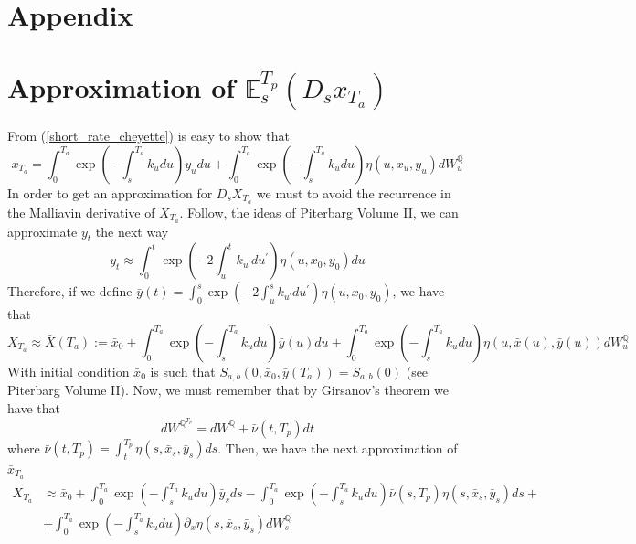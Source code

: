 \documentclass[a4paper,10pt]{article}
\newcommand{\1}{\mathbf{1}}
\begin{document}
\section*{Appendix}
\appendix
\renewcommand{\thesection}{\Alph{section}.\arabic{section}}
\section{Approximation of $\mathbb{E}_s^{T_p}\left(D_s x_{T_a}\right)$}
\label{expected_forward_measure_malliavin_derivative_x_t}
From (\ref{short_rate_cheyette}) is easy to show that
\begin{equation*}
x_{T_a} = \int_{0}^{T_a} \exp\left(-\int_{s}^{T_a}k_u du\right) y_u du + \int_{0}^{T_a}  \exp\left(-\int_{s}^{T_a}k_u du \right) \eta(u,x_u,y_u) dW_u^{\mathbb{Q}}  
\end{equation*}
In order to get an approximation for $D_sX_{T_a}$ we must to avoid the recurrence in the Malliavin derivative of $X_{T_a}$. Follow, the ideas of Piterbarg Volume II, we can approximate $y_t$ the next way
\begin{equation*}
y_t \approx \int_{0}^{t} \exp\left(-2\int_{u}^{t} k_{u^{\prime}} du^{\prime} \right) \eta(u,x_0,y_0) du
\end{equation*}
Therefore, if we define $\bar{y}(t)= \int_{0}^{s} \exp\left(-2\int_{u}^{s} k_{u^{\prime}} du^{\prime} \right) \eta(u,x_0,y_0)$, we have that
\begin{equation*}
X_{T_a} \approx \bar{X}(T_a):= \bar{x}_0  + \int_{0}^{T_a} \exp\left(-\int_{s}^{T_a}k_u du\right) \bar{y}(u) du + \int_{0}^{T_a}  \exp\left(-\int_{s}^{T_a}k_u du \right) \eta(u,\bar{x}(u),\bar{y}(u)) dW_u^{\mathbb{Q}}  
\end{equation*}
With initial condition  $\bar{x}_{0}$ is such that $S_{a,b}(0,\bar{x}_0, \bar{y}({T_a})) = S_{a,b}(0)$ (see Piterbarg Volume II). Now, we must remember that by Girsanov's theorem we have that 
\begin{equation*}
dW^{\mathbb{Q}^{T_p}} = dW^{\mathbb{Q}} + \bar{\nu}(t,T_p) dt 
\end{equation*}
where $\bar{\nu}(t,T_p) = \int_{t}^{T_p} \eta(s,\bar{x}_s,\bar{y}_s) ds $. Then, we have the next approximation of $\bar{x}_{T_a}$
\begin{align*}
X_{T_a} &\approx \bar{x}_0  + \int_{0}^{T_a} \exp\left(-\int_{s}^{T_a}k_u du\right) \bar{y}_s ds - \int_{0}^{T_a} \exp\left(-\int_{s}^{T_a}k_u du\right) \bar{\nu}(s, T_p) \eta(s,\bar{x}_s,\bar{y}_s) ds +  \\
&+ \int_{0}^{T_a}  \exp\left(-\int_{s}^{T_a}k_u du \right) \partial_x \eta(s,\bar{x}_s,\bar{y}_s) dW_s^{\mathbb{Q}}  
\end{align*} 
\end{document}
